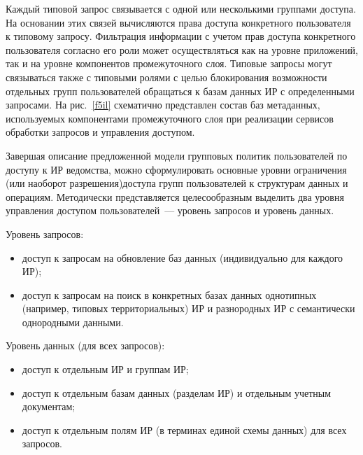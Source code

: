 \begin{multicols}{2}
      
      Каждый типовой запрос связывается с одной или несколькими группами доступа. На 
основании\linebreak
этих связей вычисляются права доступа конкретного пользователя к типовому 
запросу. Фильтрация информации с учетом прав доступа конкретного пользователя согласно 
его роли может\linebreak
осуществляться как на уровне приложений, так и на уровне компонентов 
промежуточного слоя. Типовые запросы могут связываться также с типовыми ролями с целью 
блокирования возможности отдельных групп пользователей обращаться к базам данных ИР с 
определенными запросами. На рис.~\ref{f5il} схематично представлен состав баз метаданных, 
используемых компонентами промежуточного слоя при реализации сервисов обработки 
запросов и управления доступом. 
      

      Завершая описание предложенной модели групповых политик пользователей по 
доступу к ИР ведомства, можно сформулировать основные уровни 
ограничения (или наоборот разрешения)\linebreak доступа групп пользователей к структурам данных и 
операциям. Методически представляется целесообразным выделить два уровня управления 
доступом пользователей~--- уровень запросов и уровень данных. 
      
      Уровень запросов:
      \begin{itemize}
\item доступ к запросам на обновление баз данных (индивидуально для каждого ИР);
\item доступ к запросам на поиск в конкретных базах данных однотипных (например, типовых 
территориальных) ИР и разнородных ИР с семантически однородными данными.
\end{itemize}

Уровень данных (для всех запросов):
\begin{itemize}
\item доступ к отдельным ИР и группам ИР;
\item доступ к отдельным базам данных (разделам ИР) и отдельным учетным документам;
\item доступ к отдельным полям ИР (в терминах единой схемы данных) для всех запросов.
\end{itemize}


\end{multicols}
